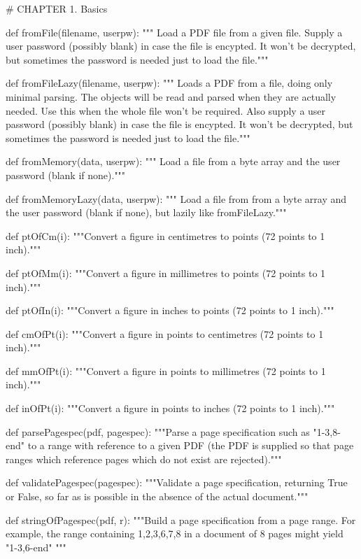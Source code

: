 # CHAPTER 1. Basics

def fromFile(filename, userpw):
    """ Load a PDF file from a given file.
    Supply a user password (possibly blank) in case the file is encypted. It
    won't be decrypted, but sometimes the password is needed just to load the
    file."""

def fromFileLazy(filename, userpw):
    """ Loads a PDF from a file, doing only
    minimal parsing. The objects will be read and parsed when they are actually
    needed.  Use this when the whole file won't be required. Also supply a user
    password (possibly blank) in case the file is encypted. It won't be
    decrypted, but sometimes the password is needed just to load the file."""

def fromMemory(data, userpw):
    """ Load a file from a byte array and the user password (blank if none)."""

def fromMemoryLazy(data, userpw):
    """ Load a file from from a byte array and the user password (blank if
    none), but lazily like fromFileLazy."""

def ptOfCm(i):
    """Convert a figure in centimetres to points (72 points to 1 inch)."""

def ptOfMm(i):
    """Convert a figure in millimetres to points (72 points to 1 inch)."""

def ptOfIn(i):
    """Convert a figure in inches to points (72 points to 1 inch)."""

def cmOfPt(i):
    """Convert a figure in points to centimetres (72 points to 1 inch)."""

def mmOfPt(i):
    """Convert a figure in points to millimetres (72 points to 1 inch)."""

def inOfPt(i):
    """Convert a figure in points to inches (72 points to 1 inch)."""

def parsePagespec(pdf, pagespec):
    """Parse a page specification such as "1-3,8-end" to a range with reference
    to a given PDF (the PDF is supplied so that page ranges which reference
    pages which do not exist are rejected)."""

def validatePagespec(pagespec):
    """Validate a page specification, returning True or False, so far as is
    possible in the absence of the actual document."""

def stringOfPagespec(pdf, r):
    """Build a page specification from a page
    range. For example, the range containing 1,2,3,6,7,8 in a document of 8
    pages might yield "1-3,6-end" """

